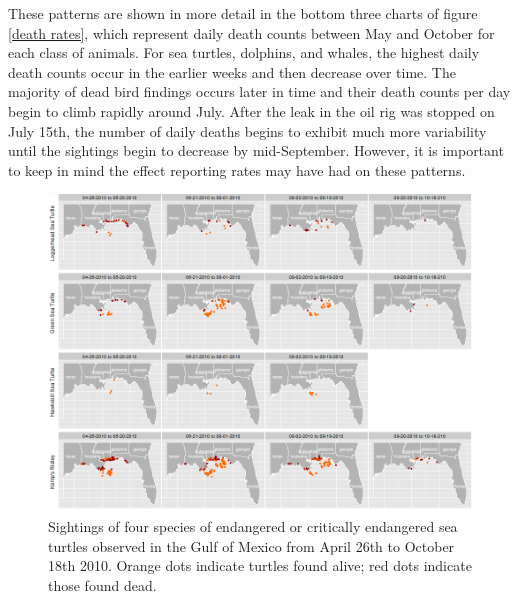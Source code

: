 \documentclass[authoryear,12pt]{elsarticle}
\begin{document}
These patterns are shown in more detail in  the  {bottom three} charts of figure \ref{death rates}, which represent daily death counts between May and October for each class of animals. For sea turtles, dolphins, and whales, the highest daily death counts occur in the earlier weeks and then decrease over time.  The majority of dead bird findings occurs later in time and their death counts per day begin to climb rapidly around July. After the leak  {in the oil rig} was stopped on July 15th, the number of daily deaths  {begins to exhibit much more} variability until {the sightings} begin to decrease by mid-September. 
However, it is important to keep in mind the effect reporting rates may have had on these patterns. 

\begin{figure}[htbp] %
   \centering
   \includegraphics[width=6in]{turtles.png} 
   \caption{Sightings of four species of endangered or critically endangered sea turtles observed in the Gulf of Mexico from April 26th to October 18th 2010.  Orange dots indicate turtles found alive; red dots indicate those found dead.}
   \label{turtles}
\end{figure}
\end{document}
